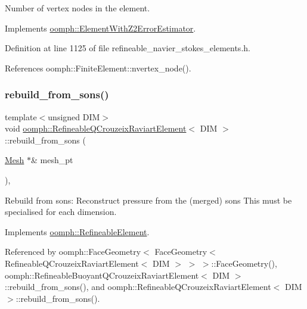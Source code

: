 Number of vertex nodes in the element. 



Implements \hyperlink{classoomph_1_1ElementWithZ2ErrorEstimator_a19495a0e77ef4ff35f15fdf7913b4077}{oomph\+::\+Element\+With\+Z2\+Error\+Estimator}.



Definition at line 1125 of file refineable\+\_\+navier\+\_\+stokes\+\_\+elements.\+h.



References oomph\+::\+Finite\+Element\+::nvertex\+\_\+node().

\mbox{\label{classoomph_1_1RefineableQCrouzeixRaviartElement_ac0b49e03ad0b0586e19f8f72a79f8a0c}} 
\subsubsection{\texorpdfstring{rebuild\+\_\+from\+\_\+sons()}{rebuild\_from\_sons()}\hspace{0.1cm}{\footnotesize\ttfamily [1/3]}}
{\footnotesize\ttfamily template$<$unsigned D\+IM$>$ \\
void \hyperlink{classoomph_1_1RefineableQCrouzeixRaviartElement}{oomph\+::\+Refineable\+Q\+Crouzeix\+Raviart\+Element}$<$ D\+IM $>$\+::rebuild\+\_\+from\+\_\+sons (\begin{DoxyParamCaption}\item[{\hyperlink{classoomph_1_1Mesh}{Mesh} $\ast$\&}]{mesh\+\_\+pt }\end{DoxyParamCaption})\hspace{0.3cm}{\ttfamily [inline]}, {\ttfamily [virtual]}}



Rebuild from sons\+: Reconstruct pressure from the (merged) sons This must be specialised for each dimension. 



Implements \hyperlink{classoomph_1_1RefineableElement_a33324be27833fa4b78279d17158215fa}{oomph\+::\+Refineable\+Element}.



Referenced by oomph\+::\+Face\+Geometry$<$ Face\+Geometry$<$ Refineable\+Q\+Crouzeix\+Raviart\+Element$<$ D\+I\+M $>$ $>$ $>$\+::\+Face\+Geometry(), oomph\+::\+Refineable\+Buoyant\+Q\+Crouzeix\+Raviart\+Element$<$ D\+I\+M $>$\+::rebuild\+\_\+from\+\_\+sons(), and oomph\+::\+Refineable\+Q\+Crouzeix\+Raviart\+Element$<$ D\+I\+M $>$\+::rebuild\+\_\+from\+\_\+sons().

